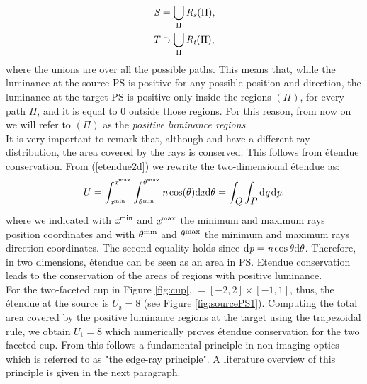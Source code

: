 \begin{equation}
\begin{aligned}
\mbox{$\emph{S}_{\textit{}}$} &= \bigcup_{\Pi} \mbox{$\emph{R}_{\textit{\textrm{s}}}$}(\Pi),\\
\mbox{$\emph{T}_{\textit{}}$} &\supset \bigcup_{\Pi} \mbox{$\emph{R}_{\textit{\textrm{t}}}$}(\Pi),
\end{aligned}
\end{equation}
where the unions are over all the possible paths.
This means that, while the luminance at the source PS is positive for any possible position and direction, the luminance at the target PS is positive only inside the regions $(\Pi)$, for every path $\Pi$, and it is equal to $0$ outside those regions. For this reason, from now on we will refer to $(\Pi)$ as the \textit{positive luminance regions}. \\ \indent
It is very important to remark that, although  and  have a different ray distribution, the area covered by the rays is conserved. This follows from \'{e}tendue conservation. From (\ref{etendue2d}) we rewrite the two-dimensional \'{e}tendue as:
\begin{equation}
U = \int_{\textit{x}^{\textrm{min}}}^{\textit{x}^{\textrm{max}}} \int_{\theta^{\textrm{min}}}^{\theta^{\textrm{max}}} \textit{n} \cos(\theta)\textrm{d}\textit{x}\textrm{d}\theta= \int_{\mbox{$\emph{Q}_{\textit{}}$}}\int_{\mbox{$\emph{P}_{\textit{}}$}} \textrm{d}\textit{q}\,\textrm{d}\textit{p}.
\end{equation}
where we indicated with $\textit{x}^{\textrm{min}}$ and $\textit{x}^{\textrm{max}}$ the minimum and maximum rays position coordinates and with $\theta^{\textrm{min}}$ and $\theta^{\textrm{max}}$ the minimum and maximum rays direction coordinates. The second equality holds since $\textrm{d}\textit{p}= \textit{n}\cos \theta\textrm{d}\theta$.
Therefore, in two dimensions, \'{e}tendue can be seen as an area in PS. Etendue conservation leads to the conservation of the areas of regions with positive luminance.\\ \indent
For the two-faceted cup in Figure \ref{fig:cup}, $= [-2,2]\times[-1,1]$, thus, the \'{e}tendue at the source is $U_\textrm{s}=8$ (see Figure \ref{fig:sourcePS1}). Computing the total area covered by the positive luminance regions at the target using the trapezoidal rule, we obtain $U_\textrm{t}=8$ which numerically proves \'{e}tendue conservation for the two faceted-cup. 
From this follows a fundamental principle in non-imaging optics which is referred to as "the edge-ray principle". A literature overview of this principle is given in the next paragraph.
